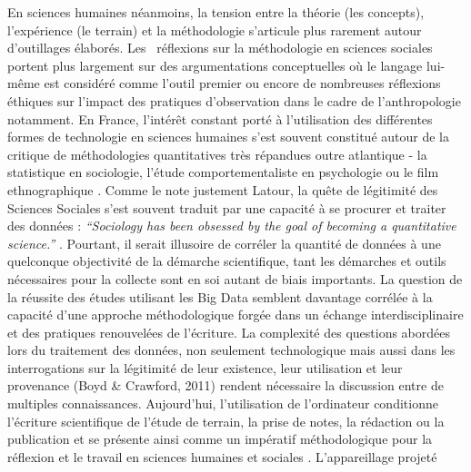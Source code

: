 En sciences humaines n\'eanmoins, la tension entre la th\'eorie (les
concepts), l{\textquoteright}exp\'erience (le terrain) et la
m\'ethodologie s{\textquoteright}articule plus rarement autour
d{\textquoteright}outillages \'elabor\'es. Les \ r\'eflexions sur la
m\'ethodologie en sciences sociales portent plus largement sur des
argumentations conceptuelles o\`u le langage lui-m\^eme est
consid\'er\'e comme l{\textquoteright}outil premier ou encore de
nombreuses r\'eflexions \'ethiques sur l{\textquoteright}impact des
pratiques d{\textquoteright}observation dans le cadre de
l{\textquoteright}anthropologie notamment. En France,
l{\textquoteright}int\'er\^et constant port\'e \`a
l{\textquoteright}utilisation des diff\'erentes formes de technologie
en sciences humaines s{\textquoteright}est souvent constitu\'e autour
de la critique de m\'ethodologies quantitatives tr\`es r\'epandues
outre atlantique - la statistique en sociologie,
l{\textquoteright}\'etude comportementaliste en psychologie ou le film
ethnographique \cite{Becker1974}. Comme le note justement Latour, la
qu\^ete de l\'egitimit\'e des Sciences Sociales s{\textquoteright}est
souvent traduit par une capacit\'e \`a se procurer et traiter des
donn\'ees : \textit{{\textquotedblleft}Sociology has been obsessed by
the goal of becoming a quantitative science.{\textquotedblright}}
\cite{Latour2010}. Pourtant, il serait illusoire de corr\'eler la
quantit\'e de donn\'ees \`a une quelconque objectivit\'e de la
d\'emarche scientifique, tant les d\'emarches et outils n\'ecessaires
pour la collecte sont en soi autant de biais importants. La question de
la r\'eussite des \'etudes utilisant les Big Data semblent davantage
corr\'el\'ee \`a la capacit\'e d{\textquoteright}une approche
m\'ethodologique forg\'ee dans un \'echange interdisciplinaire et des
pratiques renouvel\'ees de l{\textquoteright}\'ecriture. La
complexit\'e des questions abord\'ees lors du traitement des donn\'ees,
non seulement technologique mais aussi dans les interrogations sur la
l\'egitimit\'e de leur existence, leur utilisation et leur provenance
(Boyd \& Crawford, 2011) rendent n\'ecessaire la discussion entre de
multiples connaissances. Aujourd{\textquoteright}hui,
l{\textquoteright}utilisation de l{\textquoteright}ordinateur
conditionne l{\textquoteright}\'ecriture scientifique de
l{\textquoteright}\'etude de terrain, la prise de notes, la r\'edaction
ou la publication et se pr\'esente ainsi comme un imp\'eratif
m\'ethodologique pour la r\'eflexion et le travail en sciences humaines
et sociales \cite{Wieviorka2013}. L{\textquoteright}appareillage projet\'e
